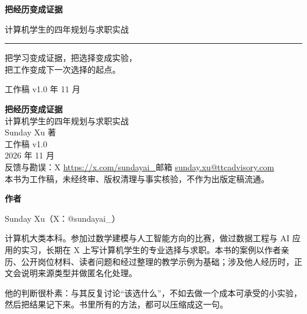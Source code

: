 \documentclass[UTF8,zihao=5,openany]{ctexbook}
\begin{document}
\begin{titlepage}
\thispagestyle{empty}
\centering
\vspace*{0.6cm}
\noindent{\color{teal!70}\rule{\textwidth}{0.5pt}}\par
\vspace{2.6cm}
{\fontsize{34pt}{44pt}\selectfont\bfseries\color{ink} 把经历变成证据\par}
\vspace{0.9cm}
{\large\color{teal} 计算机学生的四年规划与求职实战\par}
\vspace{1.2cm}
{\color{teal!55}\rule{5.5cm}{2pt}}\par
\vspace{2.4cm}
\begin{tcolorbox}[colback=mint,colframe=teal,width=0.88\textwidth,boxrule=0.8pt,arc=3mm]
\centering\normalsize
把学习变成证据，把选择变成实验，\\[2pt]
把工作变成下一次选择的起点。
\end{tcolorbox}
\vfill
{\small\color{ink} 工作稿 v1.0 年 11 月\par}
\vspace{0.5cm}
\noindent{\color{teal!70}\rule{\textwidth}{0.5pt}}
\end{titlepage}
\thispagestyle{empty}
\vspace*{3cm}
\begin{center}
{\large\bfseries 把经历变成证据}\\[0.2cm]
{\normalsize 计算机学生的四年规划与求职实战}\\[1.6cm]
{\normalsize Sunday Xu 著}\\[0.2cm]
{\normalsize 工作稿 v1.0}\\[0.3cm]
{\normalsize 2026 年 11 月}\\[2.2cm]
{\small 反馈与勘误：X \url{https://x.com/sundayai_}\quad 邮箱 \url{sunday.xu@ttcadvisory.com}}\\[1.2cm]
{\footnotesize 本书为工作稿，未经终审、版权清理与事实核验，不作为出版定稿流通。}
\end{center}
\clearpage
\frontmatter
\thispagestyle{empty}
\vspace*{1.2cm}
\noindent\noindent{\color{teal!70}\rule{\textwidth}{0.5pt}}\par
\vspace{1.4cm}
{\Large\bfseries\color{ink} 作者}\par
\vspace{0.8cm}
{\large Sunday Xu（X：@sundayai\_）}\par
\vspace{1.2cm}
\begin{minipage}{0.86\textwidth}
\small
计算机大类本科。参加过数学建模与人工智能方向的比赛，做过数据工程与 AI 应用的实习，长期在 X 上写计算机学生的专业选择与求职。本书的案例以作者亲历、公开岗位材料、读者问题和经过整理的教学示例为基础；涉及他人经历时，正文会说明来源类型并做匿名化处理。

\medskip
他的判断很朴素：与其反复讨论“该选什么”，不如去做一个成本可承受的小实验，然后把结果记下来。书里所有的方法，都可以压缩成这一句。
\end{minipage}
\vfill
\noindent{\color{teal!70}\rule{\textwidth}{0.5pt}}
\clearpage
\end{document}
